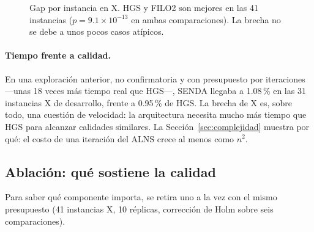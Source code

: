 \documentclass[11pt,a4paper]{article}
\newcommand{\senda}{SENDA}
\begin{document}
\begin{figure}[H]
\centering
{}
\caption{Gap por instancia en X. HGS y FILO2 son mejores en las 41 instancias ($p=9.1\times10^{-13}$
en ambas comparaciones). La brecha no se debe a unos pocos casos atípicos.}
\label{fig:x}
\end{figure}

\paragraph{Tiempo frente a calidad.} En una exploración anterior, no confirmatoria y con presupuesto
por iteraciones ---unas 18 veces más tiempo real que HGS---, SENDA llegaba a 1.08\,\% en las 31
instancias X de desarrollo, frente a 0.95\,\% de HGS. La brecha de X es, sobre todo, una cuestión de
velocidad: la arquitectura necesita mucho más tiempo que HGS para alcanzar calidades similares. La
Sección~\ref{sec:complejidad} muestra por qué: el costo de una iteración del ALNS crece al menos
como $n^2$.

\subsection{Ablación: qué sostiene la calidad}
\label{sec:ablacion}
Para saber qué componente importa, se retira uno a la vez con el mismo presupuesto (41 instancias X,
10 réplicas, corrección de Holm sobre seis comparaciones).
\end{document}
